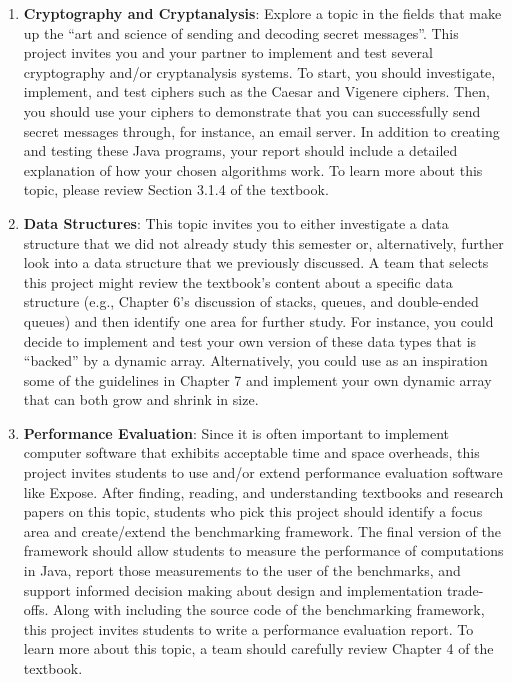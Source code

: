 \begin{enumerate}

  \item {\bf Cryptography and Cryptanalysis}: Explore a topic in the fields that make up the ``art and science of
    sending and decoding secret messages''. This project invites you and your partner to implement and test several
    cryptography and/or cryptanalysis systems.  To start, you should investigate, implement, and test ciphers such as
    the Caesar and Vigenere ciphers. Then, you should use your ciphers to demonstrate that you can successfully send
    secret messages through, for instance, an email server. In addition to creating and testing these Java programs,
    your report should include a detailed explanation of how your chosen algorithms work. To learn more about this
    topic, please review Section 3.1.4 of the textbook.

  \item {\bf Data Structures}: This topic invites you to either investigate a data structure that we did not already
    study this semester or, alternatively, further look into a data structure that we previously discussed. A team that
    selects this project might review the textbook's content about a specific data structure (e.g., Chapter 6's
    discussion of stacks, queues, and double-ended queues) and then identify one area for further study. For instance,
    you could decide to implement and test your own version of these data types that is ``backed'' by a dynamic array.
    Alternatively, you could use as an inspiration some of the guidelines in Chapter 7 and implement your own dynamic
    array that can both grow and shrink in size.


  \item {\bf Performance Evaluation}: Since it is often important to implement computer software that exhibits
    acceptable time and space overheads, this project invites students to use and/or extend performance evaluation
    software like Expose.  After finding, reading, and understanding textbooks and research papers on this topic,
    students who pick this project should identify a focus area and create/extend the benchmarking framework.  The final
    version of the framework should allow students to measure the performance of computations in Java, report those
    measurements to the user of the benchmarks, and support informed decision making about design and implementation
    trade-offs. Along with including the source code of the benchmarking framework, this project invites students to
    write a performance evaluation report. To learn more about this topic, a team should carefully review Chapter 4 of
    the textbook.


\end{enumerate}
